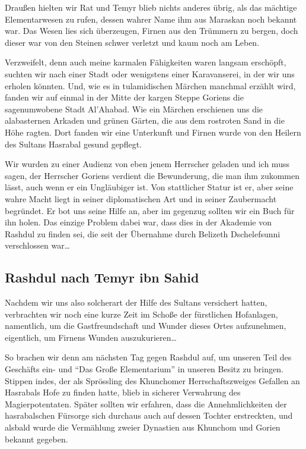 Draußen hielten wir Rat und Temyr blieb nichts anderes übrig, als das mächtige Elementarwesen zu rufen, dessen wahrer Name ihm aus Maraskan noch bekannt war. Das Wesen lies sich überzeugen, Firnen aus den Trümmern zu bergen, doch dieser war von den Steinen schwer verletzt und kaum noch am Leben.

Verzweifelt, denn auch meine karmalen Fähigkeiten waren langsam erschöpft, suchten wir nach einer Stadt oder wenigstens einer Karavanserei, in der wir uns erholen könnten. Und, wie es in tulamidischen Märchen manchmal erzählt wird, fanden wir auf einmal in der Mitte der kargen Steppe Goriens die sagenumwobene Stadt Al'Ahabad. Wie ein Märchen erschienen uns die alabasternen Arkaden und grünen Gärten, die aus dem rostroten Sand in die Höhe ragten. Dort fanden wir eine Unterkunft und Firnen wurde von den Heilern des Sultans Hasrabal gesund gepflegt.

Wir wurden zu einer Audienz von eben jenem Herrscher geladen und ich muss sagen, der Herrscher Goriens verdient die Bewunderung, die man ihm zukommen lässt, auch wenn er ein Ungläubiger ist. Von stattlicher Statur ist er, aber seine wahre Macht liegt in seiner diplomatischen Art und in seiner Zaubermacht begründet. Er bot uns seine Hilfe an, aber im gegenzug sollten wir ein Buch für ihn holen. Das einzige Problem dabei war, dass dies in der Akademie von Rashdul zu finden sei, die seit der Übernahme durch Belizeth Dschelefsunni verschlossen war\dots

\subsection{Rashdul nach Temyr ibn Sahid}

Nachdem wir uns also solcherart der Hilfe des Sultans versichert hatten, verbrachten wir noch eine kurze Zeit im Schoße der fürstlichen Hofanlagen, namentlich, um die Gastfreundschaft und Wunder dieses Ortes aufzunehmen, eigentlich, um Firnens Wunden auszukurieren\dots

So brachen wir denn am nächsten Tag gegen Rashdul auf, um unseren Teil des Geschäfts ein- und ``Das Große Elementarium'' in unseren Besitz zu bringen. Stippen indes, der als Sprössling des Khunchomer Herrschaftszweiges Gefallen an Hasrabals Hofe zu finden hatte, blieb in sicherer Verwahrung des Magierpotentaten. Später sollten wir erfahren, dass die Annehmlichkeiten der hasrabalschen Fürsorge sich durchaus auch auf dessen Tochter erstreckten, und alsbald wurde die Vermählung zweier Dynastien aus Khunchom und Gorien bekannt gegeben.

